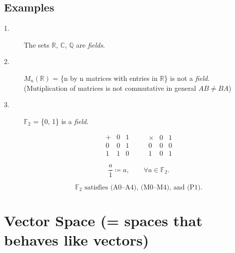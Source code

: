 \documentclass[12pt]{article}
\begin{document}
\subsection{Examples}

\begin{description}
\item[1.] The sets $\mathbb{R}$, $\mathbb{C}$, $\mathbb{Q}$ are \emph{fields}.
\item[2.] $M_n(\mathbb{R})$ = \{n by n matrices with entries in $\mathbb{R}$\} is not a \emph{field}. (Mutiplication of matrices is not commutative in general $AB \neq BA$)
\item[3.] $\mathbb{F}_{2}$ = \{0, 1\} is a \emph{field}.

\[
\begin{array}{c|cc}
+ & 0 & 1\\
\hline
0 & 0 & 1\\
1 & 1 & 0
\end{array}
\qquad
\begin{array}{c|cc}
\times & 0 & 1\\
\hline
0 & 0 & 0\\
1 & 0 & 1
\end{array}
\]

\[
\frac{a}{1}\coloneqq a, \qquad \forall a\in\mathbb{F}_2.
\]

\[
\mathbb{F}_2 \text{ satisfies (A0--A4), (M0--M4), and (P1).}
\]
\end{description}

\newpage

\section{Vector Space (= spaces that behaves like vectors)}
\end{document}
